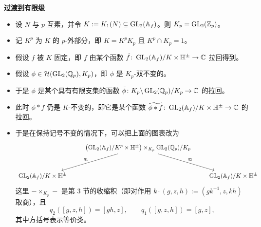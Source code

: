 \medskip
\noindent\textbf{过渡到有限级}
\begin{itemize}
\item 设 $N$ 与 $p$ 互素，并令 $K:=K_1(N)\subseteq\operatorname{GL}_2(\mathbb{A}_f)$。则 $K_p=\operatorname{GL}_2(\mathbb{Z}_p)$。
\item 记 $K^p$ 为 $K$ 的 $p$-外部分，即 $K=K^pK_p$ 且 $K^p\cap K_p=1$。
\item 假设 $f$ 被 $K$ 固定，即 $f$ 由某个函数 $\tilde f\colon\operatorname{GL}_2(\mathbb{A}_f)/K\times\mathbb{H}^\pm\to\mathbb{C}$ 拉回得到。
\item 假设 $\phi\in\mathcal{H}(\operatorname{GL}_2(\mathbb{Q}_p),K_p)$，即 $\phi$ 是 $K_p$-双不变的。
\item 于是 $\phi$ 是某个具有有限支集的函数 $\tilde\phi\colon K_p\backslash\operatorname{GL}_2(\mathbb{Q}_p)/K_p\to\mathbb{C}$ 的拉回。
\item 此时 $\phi*f$ 仍是 $K$-不变的，即它是某个函数 $\widetilde{\phi*f}\colon\operatorname{GL}_2(\mathbb{A}_f)/K\times\mathbb{H}^\pm\to\mathbb{C}$ 的拉回。
\item 于是在保持记号不变的情况下，可以把上面的图表改为
\[
\begin{tikzcd}[column sep=2.2em, row sep=2.8em]
& \bigl(\GL_2(\Af)/K^p\times\HH^{\pm}\bigr)\times_{K_p}\GL_2(\Q_p)/K_p\arrow[dl,"q_1"']\arrow[dr,"q_2"] &\\
\GL_2(\Af)/K\times\HH^{\pm} & & \GL_2(\Af)/K\times\HH^{\pm}
\end{tikzcd}
\]
这里 $-\times_{K_p}-$ 是第 3 节的收缩积（即对作用 $k\cdot(g,z,h):=(gk^{-1},z,kh)$ 取商），且
\[
q_2([g,z,h])=[gh,z],\qquad q_1([g,z,h])=[g,z],
\]
其中方括号表示等价类。
\end{itemize}

